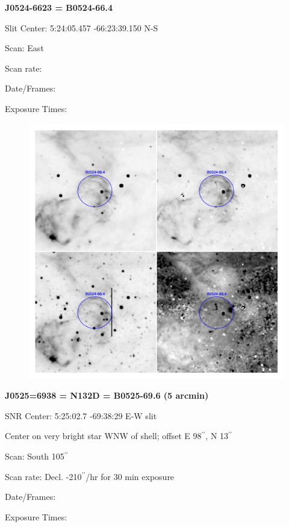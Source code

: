 \documentclass[11pt]{article}
\newcommand{\arcsec}{$^{\prime\prime}$}
\begin{document}
\newpage
{\bf J0524-6623 = B0524-66.4}  
 
Slit Center:   5:24:05.457   -66:23:39.150 N-S

Scan:  East

Scan rate:  

Date/Frames:

Exposure Times:  

\begin{figure}
\includegraphics[width=11.cm]{snapshots/B0524-664.png}
\end{figure}


\newpage
{\bf J0525=6938 = N132D = B0525-69.6 (5 arcmin)}  
 
SNR Center:   5:25:02.7   -69:38:29     E-W slit

Center on very bright star WNW of shell; offset E 98\arcsec,  N 13\arcsec

Scan:  South  105\arcsec

Scan rate:  Decl. -210\arcsec/hr  for 30 min exposure

Date/Frames:

Exposure Times:  
\end{document}
